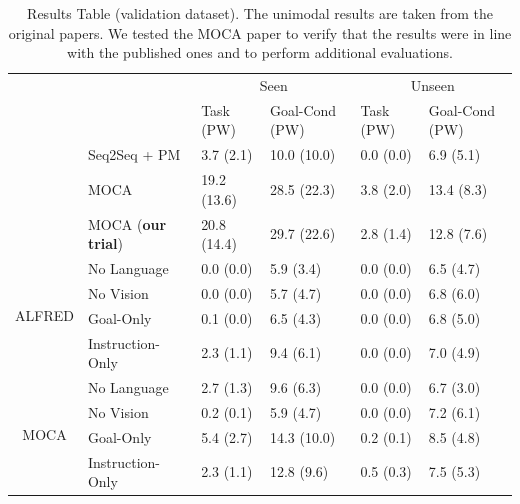 \documentclass[11pt,a4paper]{article}
\begin{document}



\begin{table}[]
\begin{tabular}{ll|l|l|l|l|}
\cline{3-6}
                                              &                  & \multicolumn{2}{c|}{Seen}    & \multicolumn{2}{c|}{Unseen} \\ \cline{3-6} 
                                              &                  & Task (PW)   & Goal-Cond (PW) & Task (PW)  & Goal-Cond (PW) \\ \cline{2-6} 
\multicolumn{1}{l|}{}                         & Seq2Seq + PM     & 3.7 (2.1)   & 10.0 (10.0)    & 0.0 (0.0)  & 6.9 (5.1)      \\ \cline{2-6} 
\multicolumn{1}{l|}{}                         & MOCA             & 19.2 (13.6) & 28.5 (22.3)    & 3.8 (2.0)  & 13.4 (8.3)     \\ \cline{2-6} 
\multicolumn{1}{l|}{}                         & MOCA (\textbf{our trial}) & 20.8 (14.4) & 29.7 (22.6)    & 2.8 (1.4)  & 12.8 (7.6)     \\ \hline  \hline
\multicolumn{1}{|l|}{\multirow{4}{*}{ALFRED}} & No Language      & 0.0 (0.0)   & 5.9 (3.4)      & 0.0 (0.0)  & 6.5 (4.7)      \\ \cline{2-6} 
\multicolumn{1}{|l|}{}                        & No Vision        & 0.0 (0.0)   & 5.7 (4.7)      & 0.0 (0.0)  & 6.8 (6.0)      \\ \cline{2-6} 
\multicolumn{1}{|l|}{}                        & Goal-Only        & 0.1 (0.0)   & 6.5 (4.3)      & 0.0 (0.0)  & 6.8 (5.0)      \\ \cline{2-6} 
\multicolumn{1}{|l|}{}                        & Instruction-Only & 2.3 (1.1)   & 9.4 (6.1)      & 0.0 (0.0)  & 7.0 (4.9)      \\ \hline\hline
\multicolumn{1}{|c|}{\multirow{4}{*}{MOCA}}   & No Language      & 2.7 (1.3)   & 9.6 (6.3)      & 0.0 (0.0)  & 6.7 (3.0)      \\ \cline{2-6} 
\multicolumn{1}{|c|}{}                        & No Vision        & 0.2 (0.1)   & 5.9 (4.7)      & 0.0 (0.0)  & 7.2 (6.1)      \\ \cline{2-6} 
\multicolumn{1}{|c|}{}                        & Goal-Only        & 5.4 (2.7)   & 14.3 (10.0)    & 0.2 (0.1)  & 8.5 (4.8)      \\ \cline{2-6} 
\multicolumn{1}{|c|}{}                        & Instruction-Only & 2.3 (1.1)   & 12.8 (9.6)     & 0.5 (0.3)  & 7.5 (5.3)      \\ \hline

\end{tabular}
\caption{Results Table (validation dataset). The unimodal results are taken from the original papers. We tested the MOCA paper to verify that the results were in line with the published ones and to perform additional evaluations.}
\label{tab:results}
\end{table}
\end{document}
